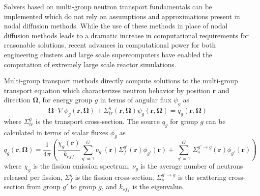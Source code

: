 \documentclass[12pt,twoside]{mitthesis-exec}
\begin{document}


 
Solvers based on multi-group neutron transport fundamentals can be implemented which do not rely on assumptions and approximations present in nodal diffusion methods. While the use of these methods in place of nodal diffusion methods leads to a dramatic increase in computational requirements for reasonable solutions, recent advances in computational power for both engineering clusters and large scale supercomputers have enabled the computation of extremely large scale reactor simulations.

Multi-group transport methods directly compute solutions to the multi-group transport equation which characterizes neutron behavior by position $\mathbf{r}$ and direction $\mathbf{\Omega}$, for energy group $g$ in terms of angular flux $\psi_{g}$ as
\begin{equation}
\nonumber
\mathbf{\Omega} \cdot \nabla \psi_{g}(\mathbf{r},\mathbf{\Omega}) +  \Sigma_{\textit{tr}}^{g}(\mathbf{r},\mathbf{\Omega}) \psi_{g}(\mathbf{r},\mathbf{\Omega}) =  q_g(\mathbf{r}, \mathbf{\Omega})
\end{equation}
where $\Sigma_{\textit{tr}}^{g}$ is the transport cross-section. The source $q_g$ for group $g$ can be calculated in terms of scalar fluxes $\phi_{g}$ as
\begin{equation}
\nonumber
q_g(\mathbf{r}, \mathbf{\Omega}) = \frac{1}{4 \pi} \left( \frac{\chi_{g}\left(\mathbf{r}\right)}{k_{\textit{eff}}} \sum_{g'=1}^{G} \nu_{g'}\left(\mathbf{r}\right) \Sigma_f^{g'}\left(\mathbf{r}\right) \phi_{g'}\left(\mathbf{r}\right) + \, \sum_{g'=1}^G \,  \Sigma_{s}^{g' \rightarrow g}\left(\mathbf{r}\right) \phi_{g'}(\mathbf{r}) \right)
\end{equation}
where $\chi_{g}$ is the fission emission spectrum, $\nu_{g}$ is the average number of neutrons released per fission, $\Sigma_f^{g}$ is the fission cross-section, $\Sigma_{s}^{g' \rightarrow g}$ is the scattering cross-section from group $g'$ to group $g$, and $k_{\textit{eff}}$ is the eigenvalue.
 
\end{document}

